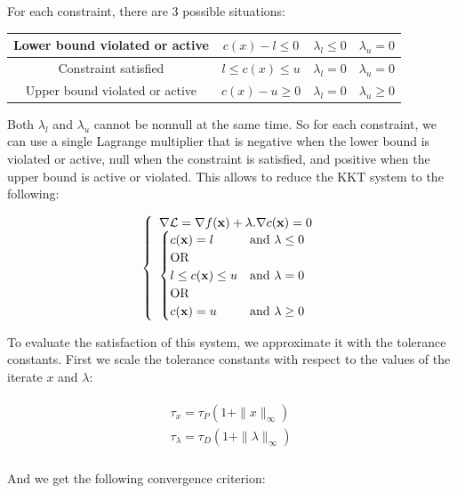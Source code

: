 For each constraint, there are 3 possible situations:

\begin{tabular}{cccc}
  \toprule
  Lower bound violated or active & $c(x)-l\leq0$ & $\lambda_l\leq0$ & $\lambda_u=0$ \\
  \midrule
  Constraint satisfied & $l\leq c(x) \leq u$ & $\lambda_l=0$ & $\lambda_u=0$ \\
  \midrule
  Upper bound violated or active & $c(x)-u\geq0$ & $\lambda_l=0$ & $\lambda_u\geq0$ \\
  \bottomrule
\end{tabular}

Both $\lambda_l$ and $\lambda_u$ cannot be nonnull at the same time. So for each constraint, we can use a single Lagrange multiplier that is negative when the lower bound is violated or active, null when the constraint is satisfied, and positive when the upper bound is active or violated.
This allows to reduce the KKT system to the following:

\begin{equation}
\label{KKTmodified}
\left\{
\begin{array}{lr}
  \nabla \mathcal{L} = \nabla f({\bf x}) + \lambda.\nabla c({\bf x}) = 0 \\
  \begin{cases}
  c({\bf x}) = l & \text{and } \lambda \leq 0 \\
  \text{OR}\\
  l \leq c({\bf x}) \leq u & \text{and } \lambda = 0 \\
  \text{OR}\\
  c({\bf x}) = u & \text{and } \lambda \geq 0
  \end{cases}
\end{array}
\right.
\end{equation}

To evaluate the satisfaction of this system, we approximate it with the tolerance constants.
First we scale the tolerance constants with respect to the values of the iterate $x$ and $\lambda$:

\begin{align}
\begin{split}
  \tau_x = \tau_P(1+\|x\|_\infty)\\
  \tau_\lambda =\tau_D(1+\|\lambda\|_\infty)\\
\end{split}
\end{align}

And we get the following convergence criterion:

